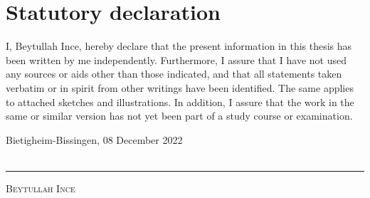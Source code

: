 \chapter*{Statutory declaration}
I, Beytullah Ince, hereby declare that the present information in this
thesis has been written by me independently.
Furthermore, I assure that I have not used any sources or aids other than those
indicated, and that all statements taken verbatim or in spirit from other writings
have been identified. The same applies to attached sketches and illustrations. In
addition, I assure that the work in the same or similar version has not yet been part of a study course or examination.

\vspace{4cm}

Bietigheim-Bissingen, 08 December 2022 \\ \\
\rule[0.0cm]{5cm}{0.5pt}

\textsc{Beytullah Ince} 